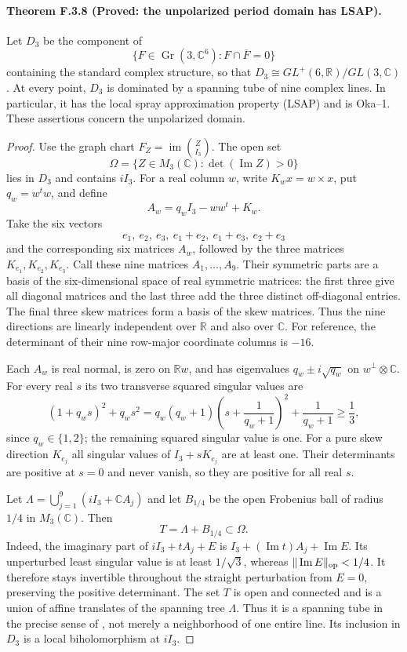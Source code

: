 \paragraph{Theorem F.3.8 (Proved: the unpolarized period domain has LSAP).}
Let $D_3$ be the component of
\[
 \{F\in\operatorname{Gr}(3,\mathbb C^6):F\cap\overline F=0\}
\]
containing the standard complex structure, so that
$D_3\cong GL^+(6,\mathbb R)/GL(3,\mathbb C)$.
At every point, $D_3$
is dominated by a spanning tube of nine complex lines.  In particular,
it has the local spray approximation property (LSAP) and is Oka--1.
These assertions concern the unpolarized domain.

\begin{proof}
Use the graph chart $F_Z=\operatorname{im}\binom Z{I_3}$.
The open set
\[
 \Omega=\{Z\in M_3(\mathbb C):\det(\operatorname{Im}Z)>0\}
 \tag{F.O1}
\]
lies in $D_3$ and contains $iI_3$.  For a real column $w$, write
$K_w x=w\times x$, put $q_w=w^tw$, and define
\[
 A_w=q_wI_3-ww^t+K_w.
 \tag{F.O2}
\]
Take the six vectors
\[
 e_1,\ e_2,\ e_3,\ e_1+e_2,\ e_1+e_3,\ e_2+e_3
\]
and the corresponding six matrices $A_w$, followed by the three
matrices $K_{e_1},K_{e_2},K_{e_3}$.  Call these nine matrices
$A_1,\ldots,A_9$.  Their symmetric parts are a basis of the
six-dimensional space of real symmetric matrices: the first three
give all diagonal matrices and the last three add the three distinct
off-diagonal entries.  The final three skew matrices form a basis
of the skew matrices.  Thus the nine directions are linearly
independent over $\mathbb R$ and also over $\mathbb C$.
For reference, the determinant of their nine row-major coordinate
columns is $-16$.

Each $A_w$ is real normal, is zero on $\mathbb Rw$, and has
eigenvalues $q_w\pm i\sqrt{q_w}$ on $w^\perp\otimes\mathbb C$.
For every real $s$ its two transverse squared singular values are
\[
 (1+q_ws)^2+q_ws^2
 =q_w(q_w+1)\left(s+\frac1{q_w+1}\right)^2
       +\frac1{q_w+1}\ge\frac13,
 \tag{F.O3}
\]
since $q_w\in\{1,2\}$; the remaining squared singular value is one.
For a pure skew direction $K_{e_j}$ all singular values of
$I_3+sK_{e_j}$ are at least one.  Their determinants are positive
at $s=0$ and never vanish, so they are positive for all real $s$.

Let $\Lambda=\bigcup_{j=1}^9(iI_3+\mathbb C A_j)$ and let
$B_{1/4}$ be the open Frobenius ball of radius $1/4$ in
$M_3(\mathbb C)$.  Then
\[
 T=\Lambda+B_{1/4}\subset\Omega.
 \tag{F.O4}
\]
Indeed, the imaginary part of $iI_3+tA_j+E$ is
$I_3+(\operatorname{Im}t)A_j+\operatorname{Im}E$.
Its unperturbed least singular value is at least $1/\sqrt3$,
whereas $\|\operatorname{Im}E\|_{\rm op}<1/4$.
It therefore stays invertible throughout the straight perturbation
from $E=0$, preserving the positive determinant.
The set $T$ is open and connected and is a union of affine
translates of the spanning tree $\Lambda$.  Thus it is a spanning
tube in the precise sense of \cite[Definition 2.1]{ffAlarconForstneric25},
not merely a neighborhood of one entire line.  Its inclusion in
$D_3$ is a local biholomorphism at $iI_3$.


\end{proof}
